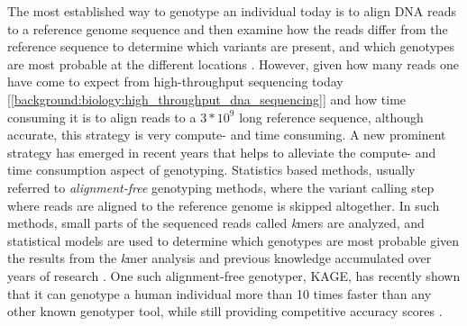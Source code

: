 The most established way to genotype an individual today is to align DNA reads to a reference genome sequence and then examine how the reads differ from the reference sequence to determine which variants are present, and which genotypes are most probable at the different locations \cite{gatk}.
However, given how many reads one have come to expect from high-throughput sequencing today [\ref{background:biology:high_throughput_dna_sequencing}] and how time consuming it is to align reads to a $3*10^9$ long reference sequence, although accurate, this strategy is very compute- and time consuming.
A new prominent strategy has emerged in recent years that helps to alleviate the compute- and time consumption aspect of genotyping.
Statistics based methods, usually referred to \textit{alignment-free} genotyping methods, where the variant calling step where reads are aligned to the reference genome is skipped altogether. 
In such methods, small parts of the sequenced reads called \textit{k}mers are analyzed, and statistical models are used to determine which genotypes are most probable given the results from the \textit{k}mer analysis and previous knowledge accumulated over years of research \cite{kage,malva,1000_genomes_project}.
One such alignment-free genotyper, KAGE, has recently shown that it can genotype a human individual more than 10 times faster than any other known genotyper tool, while still providing competitive accuracy scores \cite{kage}.
